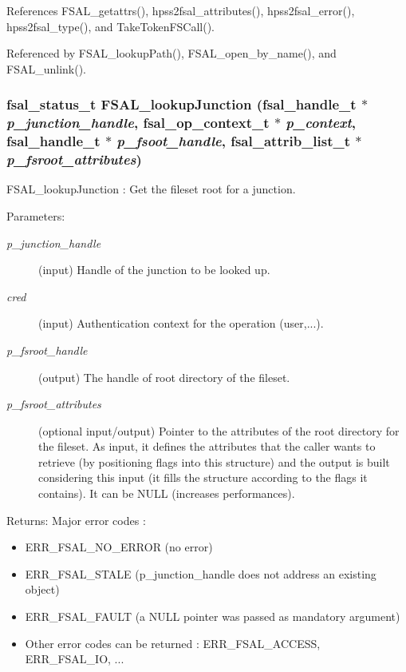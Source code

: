References FSAL\_\-getattrs(), hpss2fsal\_\-attributes(), hpss2fsal\_\-error(), hpss2fsal\_\-type(), and TakeTokenFSCall().

Referenced by FSAL\_\-lookupPath(), FSAL\_\-open\_\-by\_\-name(), and FSAL\_\-unlink().
\subsubsection[{FSAL\_\-lookupJunction}]{\setlength{\rightskip}{0pt plus 5cm}fsal\_\-status\_\-t FSAL\_\-lookupJunction (fsal\_\-handle\_\-t $\ast$ {\em p\_\-junction\_\-handle}, \/  fsal\_\-op\_\-context\_\-t $\ast$ {\em p\_\-context}, \/  fsal\_\-handle\_\-t $\ast$ {\em p\_\-fsoot\_\-handle}, \/  fsal\_\-attrib\_\-list\_\-t $\ast$ {\em p\_\-fsroot\_\-attributes})}\label{fsal__lookup_8c_6bdedadb7c4448da0d38f7382af1cc10}


FSAL\_\-lookupJunction : Get the fileset root for a junction.

\begin{Desc}
\item[Parameters:]
\begin{description}
\item[{\em p\_\-junction\_\-handle}](input) Handle of the junction to be looked up. \item[{\em cred}](input) Authentication context for the operation (user,...). \item[{\em p\_\-fsroot\_\-handle}](output) The handle of root directory of the fileset. \item[{\em p\_\-fsroot\_\-attributes}](optional input/output) Pointer to the attributes of the root directory for the fileset. As input, it defines the attributes that the caller wants to retrieve (by positioning flags into this structure) and the output is built considering this input (it fills the structure according to the flags it contains). It can be NULL (increases performances).\end{description}
\end{Desc}
\begin{Desc}
\item[Returns:]Major error codes :\begin{itemize}
\item ERR\_\-FSAL\_\-NO\_\-ERROR (no error)\item ERR\_\-FSAL\_\-STALE (p\_\-junction\_\-handle does not address an existing object)\item ERR\_\-FSAL\_\-FAULT (a NULL pointer was passed as mandatory argument)\item Other error codes can be returned : ERR\_\-FSAL\_\-ACCESS, ERR\_\-FSAL\_\-IO, ... \end{itemize}
\end{Desc}


